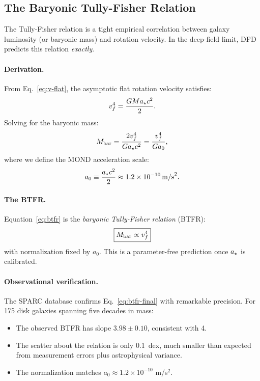 \subsection{The Baryonic Tully-Fisher Relation}\label{sec:galactic-btf}

The Tully-Fisher relation is a tight empirical correlation between galaxy luminosity (or baryonic mass) and rotation velocity. In the deep-field limit, DFD predicts this relation \textit{exactly}.

\paragraph{Derivation.}
From Eq.~\eqref{eq:v-flat}, the asymptotic flat rotation velocity satisfies:
\begin{equation}
v_f^4 = \frac{GMa_\star c^2}{2}.
\end{equation}
Solving for the baryonic mass:
\begin{equation}\label{eq:btfr}
M_{\rm bar} = \frac{2v_f^4}{Ga_\star c^2} = \frac{v_f^4}{Ga_0},
\end{equation}
where we define the MOND acceleration scale:
\begin{equation}
a_0 \equiv \frac{a_\star c^2}{2} \approx 1.2 \times 10^{-10}\,\text{m/s}^2.
\end{equation}

\paragraph{The BTFR.}
Equation~\eqref{eq:btfr} is the \textit{baryonic Tully-Fisher relation} (BTFR):
\begin{equation}\label{eq:btfr-final}
\boxed{M_{\rm bar} \propto v_f^4}
\end{equation}
with normalization fixed by $a_0$. This is a parameter-free prediction once $a_\star$ is calibrated.

\paragraph{Observational verification.}
The SPARC database \cite{McGaugh2016RAR,Lelli2017} confirms Eq.~\eqref{eq:btfr-final} with remarkable precision. For 175 disk galaxies spanning five decades in mass:
\begin{itemize}
\item The observed BTFR has slope $3.98 \pm 0.10$, consistent with 4.
\item The scatter about the relation is only 0.1~dex, much smaller than expected from measurement errors plus astrophysical variance.
\item The normalization matches $a_0 \approx 1.2 \times 10^{-10}$ m/s$^2$.
\end{itemize}

